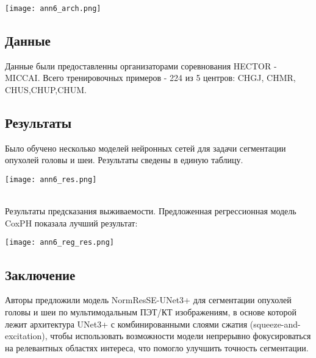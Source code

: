     \begin{minipage}{1.0\linewidth}
        \begin{center} 
        \texttt{[image: ann6\_arch.png]}
     \end{center}

    \end{minipage}

\subsection*{Данные}
Данные были предоставленны организаторами соревнования HECTOR - MICCAI. Всего 
тренировочных примеров - 224 из 5 центров: CHGJ, CHMR, CHUS,CHUP,CHUM.

\subsection*{Результаты}
Было обучено несколько моделей нейронных сетей для задачи сегментации опухолей головы и шеи. 
Результаты сведены в единую таблицу.
\begin{minipage}{1.0\linewidth}
    \texttt{[image: ann6\_res.png]}
\end{minipage}
\\

Результаты предсказания выживаемости. Предложенная регрессионная модель CoxPH показала 
лучший результат: \\
\begin{minipage}{1.0\linewidth}
    \texttt{[image: ann6\_reg\_res.png]}
\end{minipage}


\subsection*{Заключение}
Авторы предложили модель NormResSE-UNet3+ для сегментации опухолей головы и шеи по мультимодальным 
ПЭТ/КТ изображениям, в основе которой лежит архитектура UNet3+ с комбинированными слоями 
сжатия (squeeze-and-excitation), чтобы использовать возможности модели непрерывно фокусироваться 
на релевантных областях интереса, что помогло улучшить точность сегментации.
